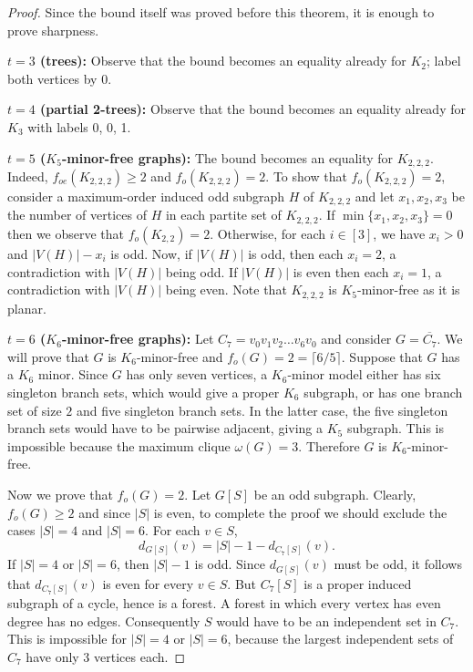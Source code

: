 \documentclass{article}
\newcommand{\2}{\vspace{0.2cm}}
\newcommand{\comp}[1]{\overline{#1}}
\begin{document}
\begin{proof}
Since the bound itself was proved before this theorem, it is enough to prove sharpness.

\2

{\bf $t=3$ (trees):} Observe that the bound becomes an equality already for $K_2$; label both vertices by 0. 

\2 

{\bf $t=4$ (partial 2-trees):} Observe that the bound becomes an equality already for $K_3$ with labels 0, 0, 1. 

\2 

{\bf $t=5$ ($K_5$-minor-free graphs):} The bound becomes an equality for $K_{2,2,2}$. Indeed, $f_{oe}(K_{2,2,2})\ge 2$ and $f_o(K_{2,2,2})=2.$ To show that $f_o(K_{2,2,2})=2$, consider a maximum-order induced odd subgraph $H$ of $K_{2,2,2}$ and let $x_1,x_2,x_3$ be the number of vertices of $H$ in each partite set of $K_{2,2,2}$. If $\min\{x_1,x_2,x_3\}=0$ then 
we observe that $f_o(K_{2,2})=2.$ Otherwise, for each $i\in [3]$, we have $x_i>0$ and $|V(H)|-x_i$ is odd. Now, if $|V(H)|$ is odd,
then each $x_i=2$, a contradiction with $|V(H)|$ being odd. If $|V(H)|$ is even then each $x_i=1$, a contradiction with $|V(H)|$ being even.
Note that $K_{2,2,2}$ is $K_5$-minor-free as it is planar. 

\2

{\bf $t=6$ ($K_6$-minor-free graphs):} Let $C_7=v_0v_1v_2\dots v_6v_0$ and consider $G=\comp{C_7}.$ We will prove that $G$ is $K_6$-minor-free and $f_o(G)=2=\lceil 6/5\rceil.$
Suppose that $G$ has a $K_6$ minor. Since $G$ has only
seven vertices, a $K_6$-minor model either has six singleton branch sets,
which would give a proper $K_6$ subgraph, or has one branch set of size $2$ and five
singleton branch sets.  In the latter case, the five singleton branch sets
would have to be pairwise adjacent, giving a $K_5$ subgraph.  This is
impossible because the maximum clique $\omega(G)=3$.  Therefore $G$ is $K_6$-minor-free.

Now we prove that $f_o(G)=2$. Let $G[S]$ be an odd subgraph. Clearly, $f_o(G)\ge 2$ and 
since $|S|$ is even, to complete the proof we should exclude the cases $|S|=4$ and $|S|=6$. 
For each $v\in S$,
\[
        d_{G[S]}(v)=|S|-1-d_{C_7[S]}(v).
\]
If $|S|=4$ or $|S|=6$, then $|S|-1$ is odd.  Since $d_{G[S]}(v)$ must
be odd, it follows that $d_{C_7[S]}(v)$ is even for every $v\in S$.
But $C_7[S]$ is a proper induced subgraph of a cycle, hence is a forest.  A
forest in which every vertex has even degree has no edges.  Consequently $S$
would have to be an independent set in $C_7$.  This is impossible for
$|S|=4$ or $|S|=6$, because the largest independent sets of $C_7$ have only 3 vertices each.
\end{proof}
\end{document}
